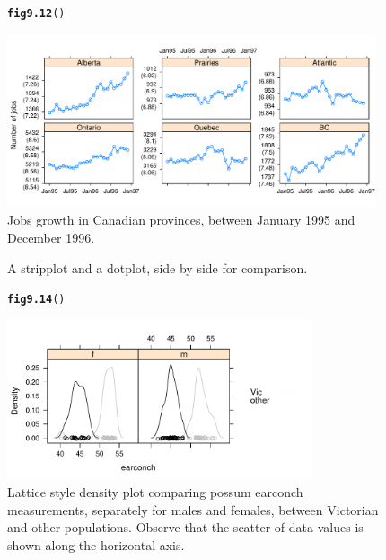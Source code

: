 \documentclass[12pt, a4paper,  BCOR=8.25mm, DIV=15]{scrartcl}\usepackage[]{graphicx}\usepackage[]{color}
\makeatletter
\newcommand{\hlstd}[1]{\textcolor[rgb]{0.345,0.345,0.345}{#1}}%
\newcommand{\hlkwd}[1]{\textcolor[rgb]{0.737,0.353,0.396}{\textbf{#1}}}%
\newenvironment{kframe}{%
 \def\at@end@of@kframe{}%
 \ifinner\ifhmode%
  \def\at@end@of@kframe{\end{minipage}}%
  \begin{minipage}{\columnwidth}%
 \fi\fi%
 \def\FrameCommand##1{\hskip\@totalleftmargin \hskip-\fboxsep
 \colorbox{shadecolor}{##1}\hskip-\fboxsep
     \hskip-\linewidth \hskip-\@totalleftmargin \hskip\columnwidth}%
 \MakeFramed {\advance\hsize-\width
   \@totalleftmargin\z@ \linewidth\hsize
   \@setminipage}}%
 {\par\unskip\endMakeFramed%
 \at@end@of@kframe}
\newenvironment{knitrout}{}{} %
\makeatother
\begin{document}
\begin{figure}[ht]
\begin{knitrout}
\color{fgcolor}\begin{kframe}
\begin{alltt}
\hlkwd{fig9.12}\hlstd{()}
\end{alltt}
\end{kframe}

{\centering \includegraphics[width=0.97\textwidth]{figs/gph-fig9_12e-1} 

}



\end{knitrout}
\caption{Jobs growth in Canadian provinces, between January 1995
  and December 1996.}\label{fig:jobsplot}
\end{figure}

\begin{figure}[ht]

\caption{A stripplot and a dotplot, side by side for comparison.}
\end{figure}

\begin{figure}[ht]
\begin{knitrout}
\color{fgcolor}\begin{kframe}
\begin{alltt}
\hlkwd{fig9.14}\hlstd{()}
\end{alltt}
\end{kframe}

{\centering \includegraphics[width=0.8\textwidth]{figs/gph-fig9_14e-1} 

}



\end{knitrout}
\caption{Lattice style density plot comparing possum earconch
    measurements, separately for males and females, between Victorian
    and other populations. Observe that the scatter of data values is
shown along the horizontal axis.}\label{fig:possumdens}
\end{figure}
\end{document}
